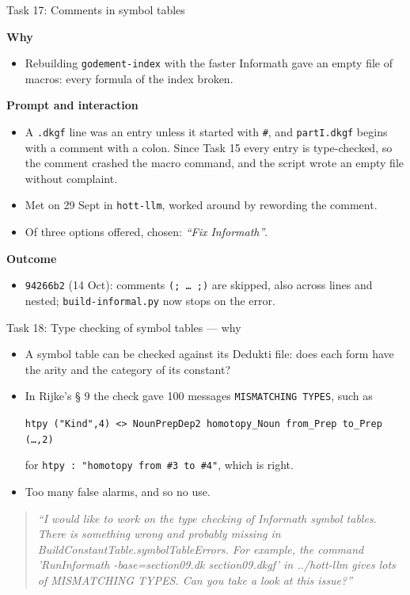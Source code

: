 \documentclass[10pt,aspectratio=169]{beamer}
\newcommand{\bad}[1]{\textcolor{warn}{#1}}
\newcommand{\commit}[1]{\texttt{\footnotesize #1}}
\newcommand{\prompt}[1]{\begin{quote}\small\itshape ``#1''\end{quote}}
\newcommand{\why}{\par\textcolor{gfblue}{\textbf{Why}}\par}
\newcommand{\how}{\par\textcolor{gfblue}{\textbf{Prompt and interaction}}\par}
\newcommand{\what}{\par\textcolor{gfblue}{\textbf{Outcome}}\par}
\begin{document}
\begin{frame}{Task 17: Comments in symbol tables}
  \why
  \begin{itemize}\small
    \item Rebuilding \texttt{godement-index} with the faster Informath gave an
          \bad{empty} file of macros: every formula of the index broken.
  \end{itemize}
  \how
  \begin{itemize}\small
    \item A \texttt{.dkgf} line was an entry unless it started with \texttt{\#}, and
          \texttt{partI.dkgf} begins with a comment with a colon. Since Task 15 every
          entry is type-checked, so the comment crashed the macro command, and the
          script wrote an empty file without complaint.
    \item Met on 29 Sept in \texttt{hott-llm}, worked around by rewording the comment.
    \item Of three options offered, chosen: \emph{``Fix Informath''}.
  \end{itemize}
  \what
  \begin{itemize}\small
    \item \commit{94266b2} (14 Oct): comments \texttt{(; \dots{} ;)} are skipped, also
          across lines and nested; \texttt{build-informal.py} now stops on the error.
  \end{itemize}
\end{frame}

\begin{frame}{Task 18: Type checking of symbol tables --- why}
  \begin{itemize}
    \item A symbol table can be checked against its Dedukti file: does each form
          have the arity and the category of its constant?
    \item In Rijke's § 9 the check gave \bad{100} messages
          \texttt{MISMATCHING TYPES}, such as
          \begin{center}\footnotesize
            \texttt{htpy ("Kind",4) <> NounPrepDep2 homotopy\_Noun from\_Prep to\_Prep (\dots,2)}
          \end{center}
          for \texttt{htpy : "homotopy from \#3 to \#4"}, which is right.
    \item Too many false alarms, and so no use.
  \end{itemize}
  \prompt{I would like to work on the type checking of Informath symbol tables. There
    is something wrong and probably missing in BuildConstantTable.symbolTableErrors.
    For example, the command 'RunInformath -base=section09.dk section09.dkgf' in
    ../hott-llm gives lots of MISMATCHING TYPES. Can you take a look at this issue?}
\end{frame}
\end{document}
